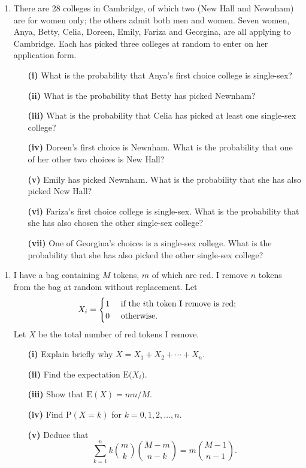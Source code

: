 \documentclass[a4, 11pt]{report}
\newlength{\qspace}
\newcounter{qnumber}
\newenvironment{question}%
 {\vspace{\qspace}
  \begin{enumerate}[\bfseries 1\quad][10]%
    \setcounter{enumi}{\value{qnumber}}%
    \item%
 }
{
  \end{enumerate}
  \filbreak
  \stepcounter{qnumber}
 }
\begin{document}
\begin{question}	
There are 28 colleges in Cambridge, of which two (New Hall and Newnham)
are for women only; the others admit both men and women. Seven women,
Anya, Betty, Celia, Doreen, Emily, Fariza and Georgina, are all applying
to Cambridge. Each has picked three colleges at random to enter on
her application form. 


\begin{itemize}[indent]
\setlength{\itemsep}{3mm}
\item[\bf (i)]  What is the probability that Anya's first choice college is
single-sex?
\item[\bf (ii)] What is the probability that Betty has picked Newnham?
\item[\bf (iii)] What is the probability that Celia has picked at least one
single-sex college?
\item[\bf (iv)] Doreen's first choice is Newnham. What is the probability that
one of her other two choices is New Hall?
\item[\bf (v)] Emily has picked Newnham. What is the probability that she
has also picked New Hall?
\item[\bf (vi)] Fariza's first choice college is single-sex. What is the probability
that she has also chosen the other single-sex college?
\item[\bf (vii)] One of Georgina's choices is a single-sex college. What is
the probability that she has also picked the other single-sex college?
\end{itemize}
\end{question}


\begin{question}
I have a bag containing $M$ tokens, $m$ of which are red. I remove
$n$ tokens from the bag at random without replacement. Let 
\[
X_{i}=\begin{cases}
1 & \mbox{ if the \ensuremath{i}th token I remove is red;}\\
0 & \mbox{ otherwise.}
\end{cases}
\]
Let $X$ be the total number of red tokens I remove. 
\begin{itemize}[indent]
\setlength{\itemsep}{3mm}

\item[\bf (i)] Explain briefly why $X=X_{1}+X_{2}+\cdots+X_{n}.$
\item[\bf (ii)] Find the expectation $\mathrm{E(}X_{i}).$
\item[\bf (iii)] Show that $\mathrm{E}(X)=mn/M$. 
\item[\bf (iv)] Find $\mathrm{P}(X=k)$ for $k=0,1,2,\ldots,n$. 
\item[\bf (v)] Deduce that 
\[
\sum_{k=1}^{n}k\binom{m}{k}\binom{M-m}{n-k}=m\binom{M-1}{n-1}.
\]
\end{itemize}
\end{question}
\end{document}
